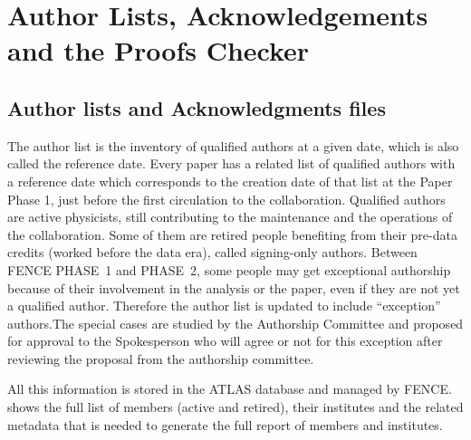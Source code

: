 
\section{Author Lists, Acknowledgements and the Proofs Checker}%
\label{sec:Authorlists_Acknowledgements_and_ProofChecker}
\subsection{Author lists and Acknowledgments files}%
\label{sec:Author_lists_and_acknowledgments_files}


The author list is the inventory of qualified authors at a given date, which is also called the reference date. Every paper has a related list of qualified authors with a reference date which corresponds to the creation date of that list at the Paper Phase 1, just before the first circulation to the collaboration. Qualified authors are active physicists, still contributing to the maintenance and the operations of the collaboration.
Some of them are retired people benefiting from their pre-data credits (worked before the data era), called signing-only authors.
Between FENCE PHASE~1 and PHASE~2, some people may get exceptional authorship because of their involvement in the analysis or the paper,
even if they are not yet a qualified author.
Therefore the author list is updated to include \enquote{exception} authors.The special cases are studied by the Authorship Committee and proposed for approval to the Spokesperson who will agree or not for this exception after reviewing the proposal from the authorship committee.

All this information is stored in the ATLAS database and managed by FENCE\@.
 shows the full list of members (active and retired), their institutes and the related metadata that is needed to generate the full report of members and institutes.

